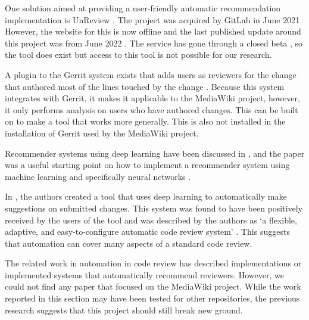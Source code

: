 One solution aimed at providing a user-friendly automatic recommendation implementation is UnReview \citep{UnReviewIoMedium}. The project was acquired by GitLab in June 2021 \citep{gitlab-acquires-unreview} However, the website for this is now offline and the last published update around this project was from June 2022 \citep{gitlab-unreview-year-later}. The service has gone through a closed beta \citep{gitlab-unreview-year-later}, so the tool does exist but access to this tool is not possible for our research.

A plugin to the Gerrit system exists that adds users as reviewers for the change that authored most of the lines touched by the change \citep{gerrit-git-blame-plugin}. Because this system integrates with Gerrit, it makes it applicable to the MediaWiki project, however, it only performs analysis on users who have authored changes. This can be built on to make a tool that works more generally. This is also not installed in the installation of Gerrit used by the MediaWiki project.

Recommender systems using deep learning have been discussed in \citeauthor{nagy2021review}, and the paper was a useful starting point on how to implement a recommender system using machine learning and specifically neural networks \citep[p. 174]{nagy2021review}.

In \citeauthor{gupta2018intelligent} \citeyear{gupta2018intelligent}, the authors created a tool that uses deep learning to automatically make suggestions on submitted changes. This system was found to have been positively received by the users of the tool \citep[p. 8]{gupta2018intelligent} and was described by the authors as `a flexible, adaptive, and easy-to-configure automatic code review system' \citep[p. 9]{gupta2018intelligent}. This suggests that automation can cover many aspects of a standard code review.

The related work in automation in code review has described implementations or implemented systems that automatically recommend reviewers. However, we could not find any paper that focused on the MediaWiki project. While the work reported in this section may have been tested for other repositories, the previous research suggests that this project should still break new ground.